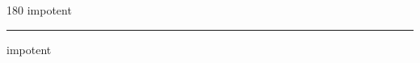 
\begin{frame}
\begin{center}
\begin{turn}{180}
{\fontsize{2.5cm}{1em}\selectfont impotent}
\end{turn}
\vspace{1em}\par  
\hrule
\vspace{1em}\par  
{\fontsize{2.5cm}{1em}\selectfont impotent}
\end{center}
\end{frame}
